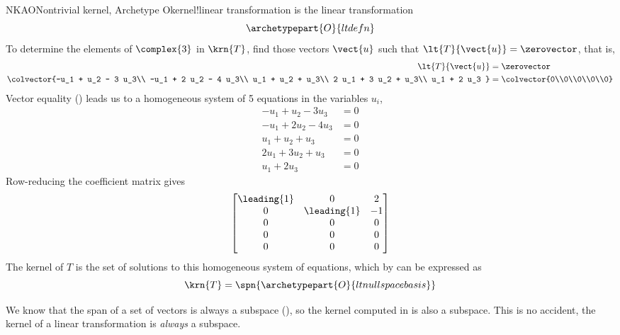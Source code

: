 \begin{example}{NKAO}{Nontrivial kernel, Archetype O}{kernel!linear transformation}
 is the linear transformation
%
\begin{equation*}
\archetypepart{O}{ltdefn}
\end{equation*}
%
To determine the elements of $\complex{3}$ in $\krn{T}$, find those vectors $\vect{u}$ such that $\lt{T}{\vect{u}}=\zerovector$, that is,
%
\begin{align*}
\lt{T}{\vect{u}}&=\zerovector\\
\colvector{-u_1 + u_2 - 3 u_3\\
-u_1 + 2 u_2 - 4 u_3\\
u_1 + u_2 + u_3\\
2 u_1 + 3 u_2 + u_3\\
u_1 + 2 u_3
}
&=
\colvector{0\\0\\0\\0\\0}
%
\end{align*}
%
Vector equality () leads us to a homogeneous system of 5 equations in the variables $u_i$,
%
\begin{align*}
-u_1 + u_2 - 3 u_3&=0\\
-u_1 + 2 u_2 - 4 u_3&=0\\
u_1 + u_2 + u_3&=0\\
2 u_1 + 3 u_2 + u_3&=0\\
u_1 + 2 u_3&=0
\end{align*}
%
Row-reducing the coefficient matrix gives
%
\begin{equation*}
\begin{bmatrix}
\leading{1} & 0 & 2\\
0 & \leading{1} & -1\\
0 & 0 & 0\\
0 & 0 & 0\\
0 & 0 & 0
\end{bmatrix}
\end{equation*}
%
The kernel of $T$ is the set of solutions to this homogeneous system of equations, which by  can be expressed as
%
\begin{equation*}
\krn{T}=\spn{\archetypepart{O}{ltnullspacebasis}}
\end{equation*}
%
\end{example}
%
We know that the span of a set of vectors is always a subspace (), so the kernel computed in  is also a subspace.  This is no accident, the kernel of a linear transformation is {\em always} a subspace.

